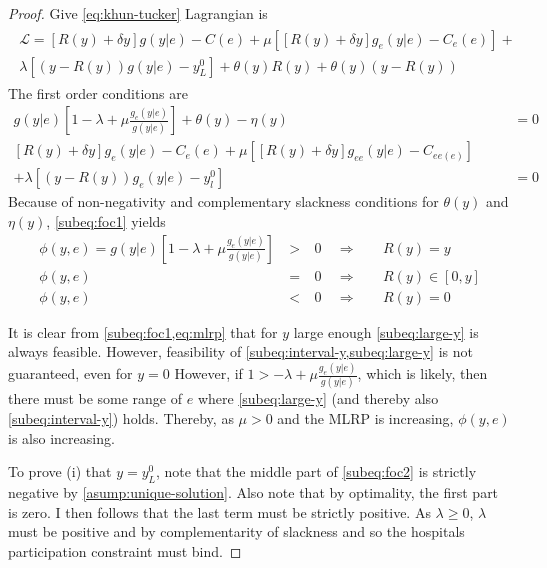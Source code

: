 \begin{proof}

Give \cref{eq:khun-tucker}  Lagrangian is
\begin{align}
    \begin{split}
        \mathcal{L}=[R(y)+\delta y]g(y|e)-C(e)+\mu [[R(y)+\delta y]g_e(y|e)-C_e(e)]+ \\ 
        \lambda [(y-R(y))g(y|e)-y_L^0]+\theta(y) R(y)+\theta(y)\left(y-R(y)\right)
    \end{split}
\end{align}
The first order conditions are
\begin{subequations}
\label{eq:foc}
\begin{align}
    g(y|e)\left[1-\lambda+\mu \frac{g_e(y|e)}{g(y|e)}\right] +\theta(y)-\eta(y) & =0 \label{subeq:foc1} \\
   [R(y)+\delta y]g_e(y|e)-C_e(e)+\mu\left[[R(y)+\delta y]g_{ee}(y|e)- C_{ee(e)}\right] \qquad & \nonumber \\ 
    +\lambda\left[(y-R(y)) g_e(y|e)-y_l^0\right] & =0 \label{subeq:foc2}
\end{align}
\end{subequations}
Because of non-negativity and complementary slackness conditions for $\theta(y)$ and $\eta(y)$, \cref{subeq:foc1} yields
\begin{subequations}
\label{eq:KT-analysis}
\begin{alignat}{3}
\phi(y,e) = g(y|e)\left[1-\lambda+\mu \frac{g_e(y|e)}{g(y|e)}\right]
   & \: > \: & 0 &\enspace \Rightarrow &&\enspace R(y)=y \label{subeq:large-y}\\
 \phi(y,e)   & \: = \: & 0 &\enspace \Rightarrow &&\enspace R(y)\in [0,y] \label{subeq:interval-y} \\
 \phi(y,e)   & \: < \: & 0 &\enspace \Rightarrow &&\enspace R(y) =0 \label{subeq:small-y}
\end{alignat}
\end{subequations}

It is clear from \cref{subeq:foc1,eq:mlrp} that for $y$ large enough \cref{subeq:large-y} is always feasible. However, feasibility of \cref{subeq:interval-y,subeq:large-y} is not guaranteed, even for $y=0$ However, if $1>-\lambda+\mu \frac{g_e(y|e)}{g(y|e)}$, which is likely, then there must be some range of $e$ where \cref{subeq:large-y} (and thereby also \cref{subeq:interval-y}) holds. Thereby, as $\mu>0$ and the MLRP is increasing, $\phi(y,e)$ is also increasing.

To prove (i) that $y=y_L^0$, note that the middle part of \cref{subeq:foc2} is strictly negative by \cref{asump:unique-solution}. Also note that by optimality, the first part is zero. I then follows that the last term must be strictly positive. As $\lambda\geq0$, $\lambda$ must be positive and by complementarity of slackness and so the hospitals participation constraint must bind. 


\end{proof}
